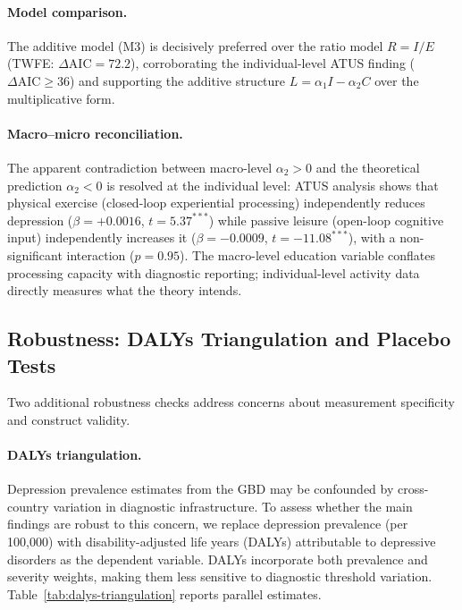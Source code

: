 \documentclass[a4paper,11pt,titlepage]{article}
\begin{document}
\paragraph{Model comparison.} The additive model (M3) is decisively preferred over the ratio model $R = I/E$ (TWFE: $\Delta\text{AIC} = 72.2$), corroborating the individual-level ATUS finding ($\Delta\text{AIC} \geq 36$) and supporting the additive structure $L = \alpha_1 I - \alpha_2 C$ over the multiplicative form.

\paragraph{Macro--micro reconciliation.} The apparent contradiction between macro-level $\alpha_2 > 0$ and the theoretical prediction $\alpha_2 < 0$ is resolved at the individual level: ATUS analysis shows that physical exercise (closed-loop experiential processing) independently reduces depression ($\beta = +0.0016$, $t = 5.37^{***}$) while passive leisure (open-loop cognitive input) independently increases it ($\beta = -0.0009$, $t = -11.08^{***}$), with a non-significant interaction ($p = 0.95$). The macro-level education variable conflates processing capacity with diagnostic reporting; individual-level activity data directly measures what the theory intends.


\subsection{Robustness: DALYs Triangulation and Placebo Tests}\label{sec:dalys-placebo}

Two additional robustness checks address concerns about measurement specificity and construct validity.

\paragraph{DALYs triangulation.}
Depression prevalence estimates from the GBD may be confounded by cross-country variation in diagnostic infrastructure. To assess whether the main findings are robust to this concern, we replace depression prevalence (per 100{,}000) with disability-adjusted life years (DALYs) attributable to depressive disorders as the dependent variable. DALYs incorporate both prevalence and severity weights, making them less sensitive to diagnostic threshold variation. Table~\ref{tab:dalys-triangulation} reports parallel estimates.
\end{document}
